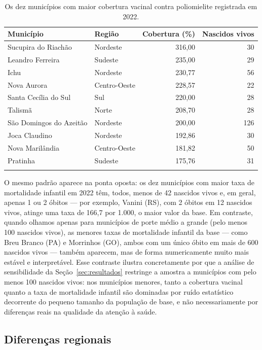 \documentclass[pdflatex,sn-mathphys-num]{sn-jnl}
\begin{document}
\begin{table}[h]
\centering
\caption{Os dez municípios com maior cobertura vacinal contra poliomielite registrada em 2022.}\label{tab:top_cobertura}
\begin{tabular}{@{}llrr@{}}
\toprule
Município & Região & Cobertura (\%) & Nascidos vivos \\
\midrule
Sucupira do Riachão & Nordeste & 316,00 & 30 \\
Leandro Ferreira & Sudeste & 235,00 & 29 \\
Ichu & Nordeste & 230,77 & 56 \\
Nova Aurora & Centro-Oeste & 228,57 & 22 \\
Santa Cecília do Sul & Sul & 220,00 & 28 \\
Talismã & Norte & 208,70 & 28 \\
São Domingos do Azeitão & Nordeste & 200,00 & 126 \\
Joca Claudino & Nordeste & 192,86 & 30 \\
Nova Marilândia & Centro-Oeste & 181,82 & 50 \\
Pratinha & Sudeste & 175,76 & 31 \\
\botrule
\end{tabular}
\end{table}

O mesmo padrão aparece na ponta oposta: os dez municípios com maior taxa de mortalidade infantil em 2022 têm, todos, menos de 42 nascidos vivos e, em geral, apenas 1 ou 2 óbitos — por exemplo, Vanini (RS), com 2 óbitos em 12 nascidos vivos, atinge uma taxa de 166,7 por 1.000, o maior valor da base. Em contraste, quando olhamos apenas para municípios de porte médio a grande (pelo menos 100 nascidos vivos), as menores taxas de mortalidade infantil da base — como Breu Branco (PA) e Morrinhos (GO), ambos com um único óbito em mais de 600 nascidos vivos — também aparecem, mas de forma numericamente muito mais estável e interpretável. Esse contraste ilustra concretamente por que a análise de sensibilidade da Seção~\ref{sec:resultados} restringe a amostra a municípios com pelo menos 100 nascidos vivos: nos municípios menores, tanto a cobertura vacinal quanto a taxa de mortalidade infantil são dominadas por ruído estatístico decorrente do pequeno tamanho da população de base, e não necessariamente por diferenças reais na qualidade da atenção à saúde.

\subsection{Diferenças regionais}
\end{document}
